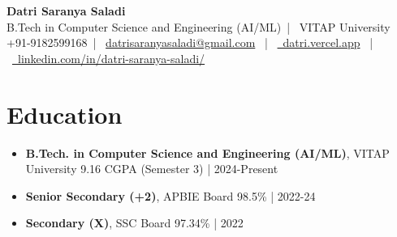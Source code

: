 \documentclass[a4paper,10pt]{article}
\makeatletter
\newcommand{\resumeSubHeadingListStart}{\begin{itemize}[leftmargin=*,labelsep=0mm,itemsep=1pt]}
\newcommand{\resumeSubHeadingListEnd}{\end{itemize}\vspace{1mm}}
\newcommand{\name}{Datri Saranya Saladi} %
\newcommand{\course}{B.Tech in Computer Science and Engineering (AI/ML)} %
\newcommand{\phone}{9182599168} %
\newcommand{\emaild}{datrisaranyasaladi@gmail.com} %
\makeatother
\begin{document}
\selectfont

\begin{center}
    \textbf{\LARGE \name} \\ \vspace{2pt}
    \small \course \ | \ VITAP University \\ \vspace{2pt}
    \small +91-\phone \ | \ \href{mailto:\emaild}{\emaild} \ | \ \href{https://datri.vercel.app/}{\faGlobe\ datri.vercel.app} \ | \ \href{https://www.linkedin.com/in/datri-saranya-saladi/}{\faLinkedin\ linkedin.com/in/datri-saranya-saladi/}
\end{center}
\vspace{-12pt}

\section{Education}
\resumeSubHeadingListStart
  \item \textbf{B.Tech. in Computer Science and Engineering (AI/ML)}, VITAP University \hfill 9.16 CGPA (Semester 3) | 2024-Present
  \item \textbf{Senior Secondary (+2)}, APBIE Board \hfill 98.5\% | 2022-24
  \item \textbf{Secondary (X)}, SSC Board \hfill 97.34\% | 2022
\resumeSubHeadingListEnd
\end{document}
